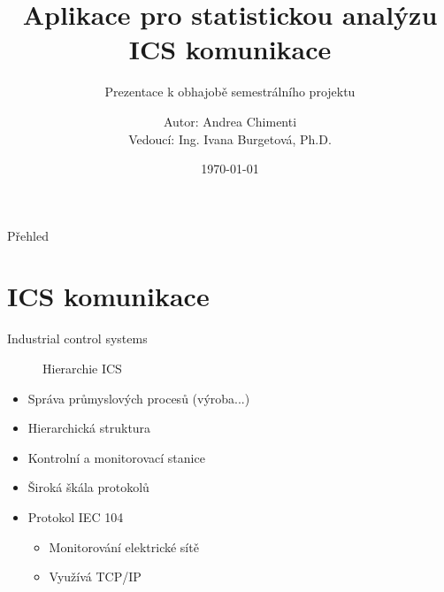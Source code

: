 \documentclass[hyperref={unicode}, xcolor={table}]{beamer}
\title{Aplikace pro statistickou analýzu ICS komunikace}
\subtitle{Prezentace k obhajobě semestrálního projektu}
\author{Autor: Andrea Chimenti\\Vedoucí: Ing. Ivana Burgetová, Ph.D.}
\date{\today}
\institute
{
    \large\textsc{
	Vysoké učení technické v~Brně\\
	Fakulta informačních technologií}
}
\begin{document}
\begin{frame}[plain]
    \titlepage
\end{frame}

\begin{frame}{Přehled}
	\tableofcontents
\end{frame}

\section{ICS komunikace}

\begin{frame}[t]{Industrial control systems}

    \begin{minipage}{4cm}
        \begin{figure}[hp]
            
            \caption{Hierarchie ICS}
        \end{figure}
    \end{minipage}
    \begin{minipage}{7cm}
        \begin{itemize}
            \item Správa průmyslových procesů (výroba...)
            \item Hierarchická struktura
            \item Kontrolní a monitorovací stanice
            \item Široká škála protokolů
            \item Protokol IEC 104
            \begin{itemize}
                \item Monitorování elektrické sítě
                \item Využívá TCP/IP
            \end{itemize}
        \end{itemize}
    \end{minipage}

\end{frame}

    
%         
    
\end{document}
